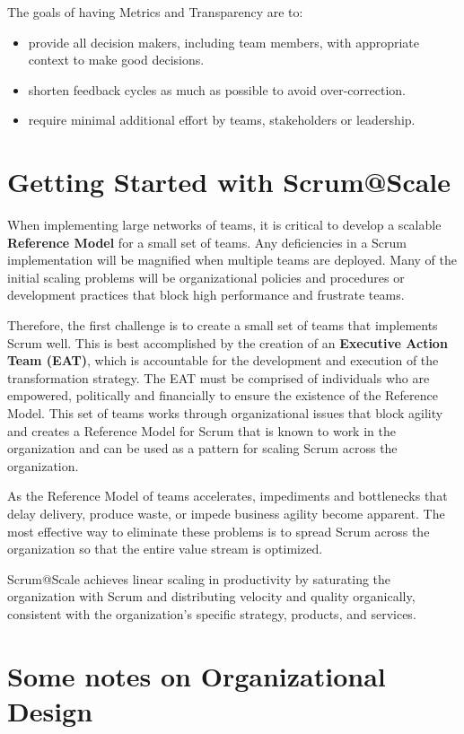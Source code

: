 \documentclass[12pt,a4paper,parskip=full]{scrartcl}
\begin{document}
The goals of having Metrics and Transparency are to:

\begin{itemize}
	\item provide all decision makers, including team members, with appropriate context to make good decisions.
	\item shorten feedback cycles as much as possible to avoid over-correction.
	\item require minimal additional effort by teams, stakeholders or leadership.
\end{itemize}

\section{Getting Started with Scrum@Scale}

When implementing large networks of teams, it is critical to develop a scalable \textbf{Reference Model} for a small set of teams. Any deficiencies in a Scrum implementation will be magnified when multiple teams are deployed. Many of the initial scaling problems will be organizational policies and procedures or development practices that block high performance and frustrate teams. 

Therefore, the first challenge is to create a small set of teams that implements Scrum well.  This is best accomplished by the creation of an \textbf{Executive Action Team (EAT)}, which is accountable for the development and execution of the transformation strategy.  The EAT must be comprised of individuals who are empowered, politically and financially to ensure the existence of the Reference Model.  This set of teams works through organizational issues that block agility and creates a Reference Model for Scrum that is known to work in the organization and can be used as a pattern for scaling Scrum across the organization.

As the Reference Model of teams accelerates, impediments and bottlenecks that delay delivery, produce waste, or impede business agility become apparent. The most effective way to eliminate these problems is to spread Scrum across the organization so that the entire value stream is optimized.

Scrum@Scale achieves linear scaling in productivity by saturating the organization with Scrum and distributing velocity and quality organically, consistent with the organization's specific strategy, products, and services.

\section{Some notes on Organizational Design}
\end{document}
